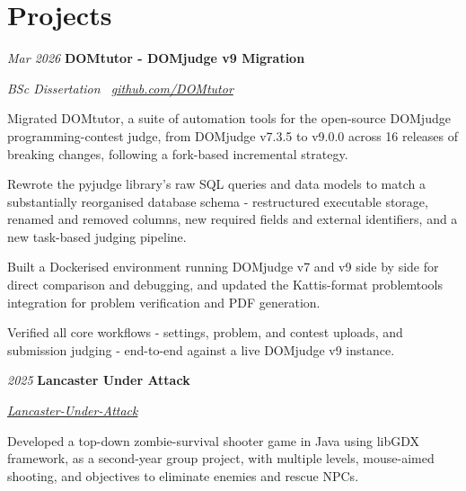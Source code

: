 \documentclass{cv}
\begin{document}
    \section{Projects}

        \begin{twocolentry}{
        \textit{Mar 2026}}
            \textbf{DOMtutor - DOMjudge v9 Migration}

            \textit{BSc Dissertation \textperiodcentered\ \href{https://github.com/DOMtutor}{github.com/DOMtutor}}
        \end{twocolentry}

        \vspace{0.10 cm}
        \begin{onecolentry}
            \begin{highlights}
                \item Migrated DOMtutor, a suite of automation tools for the open-source DOMjudge programming-contest judge, from DOMjudge v7.3.5 to v9.0.0 across 16 releases of breaking changes, following a fork-based incremental strategy.
                \item Rewrote the pyjudge library's raw SQL queries and data models to match a substantially reorganised database schema - restructured executable storage, renamed and removed columns, new required fields and external identifiers, and a new task-based judging pipeline.
                \item Built a Dockerised environment running DOMjudge v7 and v9 side by side for direct comparison and debugging, and updated the Kattis-format problemtools integration for problem verification and PDF generation.
                \item Verified all core workflows - settings, problem, and contest uploads, and submission judging - end-to-end against a live DOMjudge v9 instance.
            \end{highlights}
        \end{onecolentry}

        \vspace{0.13 cm}

        \begin{twocolentry}{
        \textit{2025}}
            \textbf{Lancaster Under Attack}

            \textit{\href{https://github.com/prosk-sudo/Lancaster-Under-Attack}{Lancaster-Under-Attack}}
        \end{twocolentry}

        \vspace{0.10 cm}
        \begin{onecolentry}
            \begin{highlights}
                \item Developed a top-down zombie-survival shooter game in Java using libGDX framework, as a second-year group project, with multiple levels, mouse-aimed shooting, and objectives to eliminate enemies and rescue NPCs.
            \end{highlights}
        \end{onecolentry}
\end{document}
